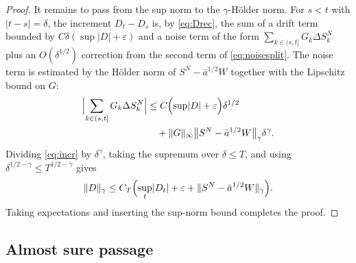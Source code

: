 \documentclass[a4paper,fleqn]{cas-dc}
\theoremstyle{definition}
\begin{document}
\begin{proof}
It remains to pass from the sup norm to the $\gamma$-H\"older norm. For $s<t$ with
$\lvert t-s\rvert=\delta$, the increment $D_{t}-D_{s}$ is, by \eqref{eq:Drec}, the sum
of a drift term bounded by $C\delta(\sup\lvert D\rvert+\varepsilon)$ and a noise term
of the form $\sum_{k\in(s,t]}G_{k}\Delta S^{N}_{k}$ plus an $O(\delta^{1/2})$ correction
from the second term of \eqref{eq:noisesplit}. The noise term is estimated by the
H\"older norm of $S^{N}-\bar a^{1/2}W$ together with the Lipschitz bound on $G$:
\begin{equation}
\begin{split}
\Bigl\lvert\sum_{k\in(s,t]}G_{k}\Delta S^{N}_{k}\Bigr\rvert
&\le C\Bigl(\sup\lvert D\rvert+\varepsilon\Bigr)\delta^{1/2}\\
&\quad+\lVert G\rVert_{\infty}\bigl\lVert S^{N}-\bar a^{1/2}W\bigr\rVert_{\gamma}\delta^{\gamma}.
\end{split}
\label{eq:incr}
\end{equation}
Dividing \eqref{eq:incr} by $\delta^{\gamma}$, taking the supremum over $\delta\le T$,
and using $\delta^{1/2-\gamma}\le T^{1/2-\gamma}$ gives
\[
\lVert D\rVert_{\gamma}\le C_{T}\Bigl(\sup_{t}\lvert D_{t}\rvert+\varepsilon
+\lVert S^{N}-\bar a^{1/2}W\rVert_{\gamma}\Bigr).
\]
Taking expectations and inserting the sup-norm bound completes the proof.
\end{proof}

\subsection{Almost sure passage}
\end{document}

